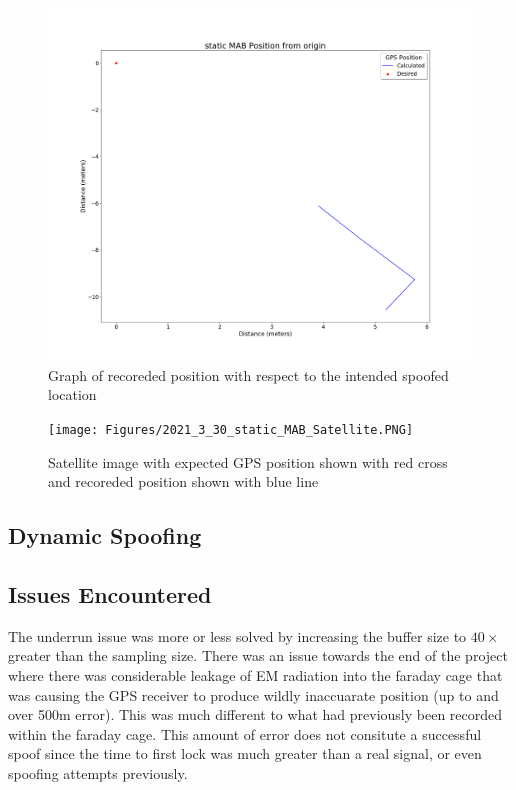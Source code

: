 \begin{figure}[h]
    \begin{centering}
        \includegraphics[width=14cm,keepaspectratio]{Figures/2021_3_30_static_MAB Position from origin.png}
        \caption{Graph of recoreded position with respect to the intended spoofed location}
        \label{fig:MABPosition}
    \end{centering}
\end{figure}

\begin{figure}[h]
    \begin{centering}
        \texttt{[image: Figures/2021\_3\_30\_static\_MAB\_Satellite.PNG]}
        \caption{Satellite image with expected GPS position shown with red cross and recoreded position shown with blue line}
        \label{fig:MABSatelliteImage}
    \end{centering}
\end{figure}

\subsection{Dynamic Spoofing}


\subsection{Issues Encountered}
The underrun issue was more or less solved by increasing the buffer size to $40\times$ greater than the sampling size.
There was an issue towards the end of the project where there was considerable leakage of EM radiation into the faraday cage that was causing the GPS receiver to produce
wildly inaccuarate position (up to and over 500m error). This was much different to what had previously been recorded within the faraday cage. This amount of error does
not consitute a successful spoof since the time to first lock was much greater than a real signal, or even spoofing attempts previously. 

